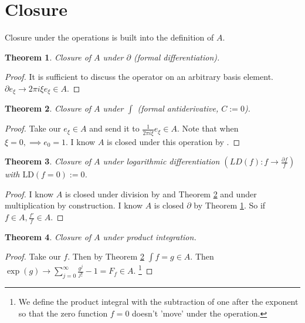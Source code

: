\documentclass{artjlt}
\newtheorem{thm}{Theorem}
\newcommand{\?}{\textbackslash}
\begin{document}
\section{Closure}
   Closure under the operations is built into the definition of $A$.
   \begin{thm} \label{thm:1}
      Closure of $A$ under $\partial$ (formal differentiation).
   \end{thm}
   \begin{proof}
      It is sufficient to discuss the operator on an arbitrary basis element. $\partial e_\xi \to 2 \pi i \xi e_{\xi} \in A$.
   \end{proof}
   \begin{thm} \label{thm:2}
      Closure of $A$ under $\int$ (formal antiderivative, $C:=0$). 
   \end{thm}
   \begin{proof}
      Take our $e_\xi \in A$ and send it to $\frac{1}{2 \pi i \xi} e_{\xi} \in A$. Note that when $\xi = 0, \implies e_0 = 1$. I know $A$ is closed under this operation by \cite{Hormander1958}. 
   \end{proof}
   \begin{thm}
      Closure of $A$ under logarithmic differentiation $(LD(f): f \to \frac{\partial f}{f})$ with $\text{LD}(f=0) := 0$.
   \end{thm}
   \begin{proof}
      I know $A$ is closed under division by \cite{Hormander1958} and Theorem \ref{thm:2} and under multiplication by construction. I know $A$ is closed $\partial$ by Theorem \ref{thm:1}. So if $f \in A, \frac{f'}{f} \in A$.
   \end{proof}
   \begin{thm} \label{thm:4}
      Closure of $A$ under product integration.
   \end{thm}
   \begin{proof}
      Take our $f$. Then by Theorem \ref{thm:2} $\int f = g \in A$. Then $\exp(g) \to \sum_{j=0}^{\infty} \frac{g^j}{j!} - 1 = F_f \in A$. \footnote{We define the product integral with the subtraction of one after the exponent so that the zero function $f=0$ doesn't 'move' under the operation.} 
\end{proof}
\end{document}
